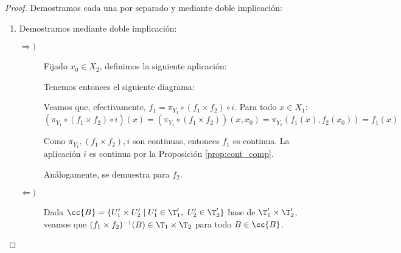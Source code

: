 \begin{proof}
    Demostramos cada una por separado y mediante doble implicación:
    \begin{enumerate}
        \item Demostramos mediante doble implicación:        
        \begin{description}
            \item[$\Longrightarrow)$] Fijado $x_0\in X_2$, definimos la siguiente aplicación:

            Tenemos entonces el siguiente diagrama:
            \begin{figure}[H]
                \centering
            \end{figure}
            Veamos que, efectivamente, $f_1 = \pi_{Y_1}\circ (f_1\times f_2)\circ i$. Para todo $x\in X_1$:
            \begin{equation*}
                (\pi_{Y_1}\circ (f_1\times f_2)\circ i)(x) = (\pi_{Y_1}\circ (f_1\times f_2))(x,x_0) = \pi_{Y_1}(f_1(x), f_2(x_0)) = f_1(x)
            \end{equation*}

            Como $\pi_{Y_1}, (f_1\times f_2), i$ son continuas, entonces $f_1$ es continua. La aplicación $i$ es continua por la Proposición \ref{prop:cont_comp}.
            
            Análogamente, se demuestra para $f_2$.
            
            \item[$\Longleftarrow)$] Dada $\cc{B}=\{U_1'\times U_2'\mid U_1'\in \T_1',~U_2'\in \T_2'\}$ base de $\T_1'\times \T_2'$, veamos que $(f_1\times f_2)^{-1}(B)\in \T_1\times \T_2$ para todo $B\in \cc{B}$.


\end{description}
\end{enumerate}
\end{proof}
